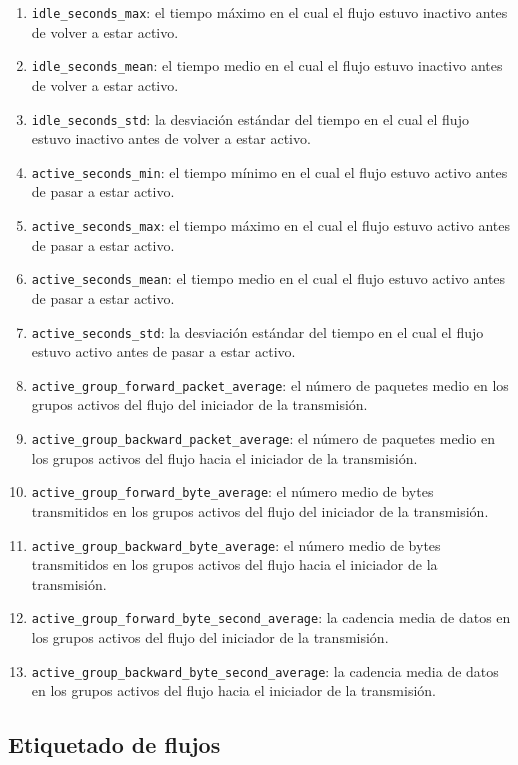 \begin{enumerate}
  \item \texttt{idle\_seconds\_max}: el tiempo máximo en el cual el flujo estuvo inactivo antes de volver a estar activo.
  \item \texttt{idle\_seconds\_mean}: el tiempo medio en el cual el flujo estuvo inactivo antes de volver a estar activo.
  \item \texttt{idle\_seconds\_std}: la desviación estándar del tiempo en el cual el flujo estuvo inactivo antes de volver a estar activo.
  \item \texttt{active\_seconds\_min}: el tiempo mínimo en el cual el flujo estuvo activo antes de pasar a estar activo.
  \item \texttt{active\_seconds\_max}: el tiempo máximo en el cual el flujo estuvo activo antes de pasar a estar activo.
  \item \texttt{active\_seconds\_mean}: el tiempo medio en el cual el flujo estuvo activo antes de pasar a estar activo.
  \item \texttt{active\_seconds\_std}: la desviación estándar del tiempo en el cual el flujo estuvo activo antes de pasar a estar activo.
  \item \texttt{active\_group\_forward\_packet\_average}: el número de paquetes medio en los grupos activos del flujo del iniciador de la transmisión.
  \item \texttt{active\_group\_backward\_packet\_average}: el número de paquetes medio en los grupos activos del flujo hacia el iniciador de la transmisión.
  \item \texttt{active\_group\_forward\_byte\_average}: el número medio de bytes transmitidos en los grupos activos del flujo del iniciador de la transmisión.
  \item \texttt{active\_group\_backward\_byte\_average}: el número medio de bytes transmitidos en los grupos activos del flujo hacia el iniciador de la transmisión.
  \item \texttt{active\_group\_forward\_byte\_second\_average}: la cadencia media de datos en los grupos activos del flujo del iniciador de la transmisión.
  \item \texttt{active\_group\_backward\_byte\_second\_average}: la cadencia media de datos en los grupos activos del flujo hacia el iniciador de la transmisión.
\end{enumerate}

\subsection{Etiquetado de flujos} \label{flowtag}

